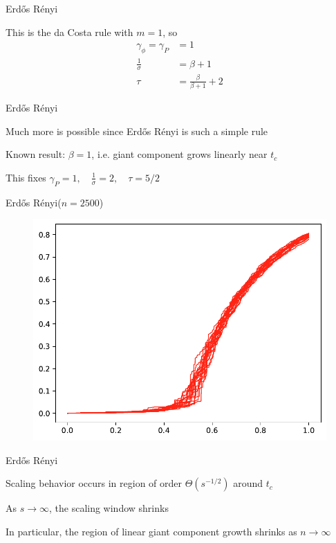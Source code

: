 \documentclass{beamer}
\newcommand{\ER}{Erd\H{o}s R\'enyi\xspace}
\newcommand{\nl}{
\vspace{5mm}

}
\begin{document}
\begin{frame}{\ER}
	
	This is the da Costa rule with $m=1$, so
	\begin{align*}
		\gamma_{\phi} = \gamma_{P} &= 1 \\
		\frac{1}{\sigma} &= \beta + 1 \\
		\tau &= \frac{\beta}{\beta + 1} + 2
	\end{align*}
	
\end{frame}

\begin{frame}{\ER}
	
	Much more is possible since \ER is such a simple rule \nl

	Known result: $\beta = 1$, i.e. giant component grows linearly near $t_{c}$ \nl

	This fixes $\gamma_{P} = 1, \quad \frac{1}{\sigma} = 2, \quad \tau = 5/2$
\end{frame}

\begin{frame}{\ER ($n =2500$)}

	\begin{figure}[H]
		\centering
		\includegraphics[scale=0.7]{fig/2500.pdf}
	\end{figure}
\end{frame}

\begin{frame}{\ER}
	
	Scaling behavior occurs in region of order $\Theta(s^{-1/2})$ around $t_{c}$ \nl

	As $s \to \infty$, the scaling window shrinks \nl

	In particular, the region of linear giant component growth shrinks as $n \to \infty$

\end{frame}
\end{document}
